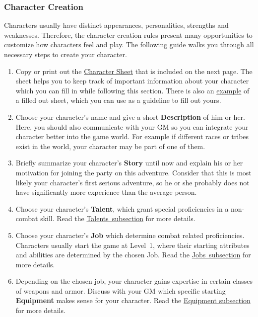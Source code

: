 \subsubsection*{Character Creation}
Characters usually have distinct appearances, personalities, strengths and weaknesses. 
Therefore, the character creation rules present many opportunities to customize how characters feel and play.
The following guide walks you through all necessary steps to create your character.
\pagebreak%

\begin{enumerate}[leftmargin=*]
	
\item Copy or print out the \hyperlink{cs}{Character Sheet} that is included on the next page.
The sheet helps you to keep track of important information about your character which you can fill in while following this section.
There is also an \hyperlink{csex}{example} of a filled out sheet, which you can use as a guideline to fill out yours.

\vfill 

\item Choose your character's name and give a short \textbf{Description} of him or her.
Here, you should also communicate with your GM so you can integrate your character better into the game world.
For example if different races or tribes exist in the world, your character may be part of one of them.

\vfill	

\item Briefly summarize your character's \textbf{Story} until now and explain his or her motivation for joining the party on this adventure.
Consider that this is most likely your character's first serious adventure, so he or she probably does not have significantly more experience than the average person.

\vfill

\item Choose your character's \textbf{Talent}, which grant special proficiencies in a non-combat skill.
Read the \mbox{\hyperlink{talent}{Talents subsection}} for more details.

\vfill

\item Choose your character's \textbf{Job} which determine combat related proficiencies. 
Characters usually start the game at Level~1, where their starting attributes and abilities are determined by the chosen Job.
Read the \hyperlink{job}{Jobs~subsection} for more details.

\vfill

\item Depending on the chosen job, your character gains expertise in certain classes of weapons and armor.
Discuss with your GM which specific starting \textbf{Equipment} makes sense for your character.
Read the \hyperlink{equip}{Equipment subsection} for more details.

\end{enumerate}

